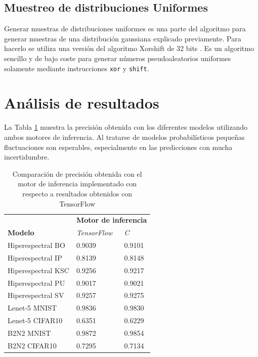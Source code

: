 \subsection{Muestreo de distribuciones Uniformes}

Generar muestras de distribuciones uniformes es una parte del algoritmo para generar muestras de una distribución gaussiana explicado previamente. Para hacerlo se utiliza una versión del algoritmo Xorshift de 32 bits \cite{xorshift}. Es un algoritmo sencillo y de bajo coste para generar números pseudoaleatorios uniformes solamente mediante instrucciones \texttt{xor} y \texttt{shift}.

\section{Análisis de resultados} \label{sec:uncertainty_example}

La Tabla \ref{tab:engine_acc} muestra la precisión obtenida con los diferentes modelos utilizando ambos motores de inferencia. Al tratarse de modelos probabilísticos pequeñas fluctuaciones son esperables, especialmente en las predicciones con mucha incertidumbre.

\begin{table}[h]
\centering
\caption{Comparación de precisión obtenida con el motor de inferencia implementado con respecto a resultados obtenidos con TensorFlow}
\label{tab:engine_acc}
\begin{tabular}{lll}
\hline
 &  \multicolumn{2}{c}{\textbf{Motor de inferencia}}\\
 \textbf{Modelo} & \textit{TensorFlow} & \textit{C} \\ \hline
 Hiperespectral BO   & 0.9039 & 0.9101 \\
 Hiperespectral IP   & 0.8139 & 0.8148 \\
 Hiperespectral KSC  & 0.9256 & 0.9217 \\
 Hiperespectral PU   & 0.9017 & 0.9021 \\
 Hiperespectral SV   & 0.9257 & 0.9275 \\
 Lenet-5 MNIST  	& 0.9836 & 0.9830 \\
 Lenet-5 CIFAR10	& 0.6351 & 0.6229 \\
 B2N2 MNIST     	& 0.9872 & 0.9854 \\
 B2N2 CIFAR10   	& 0.7295 & 0.7134 \\\hline
\end{tabular}
\end{table}

